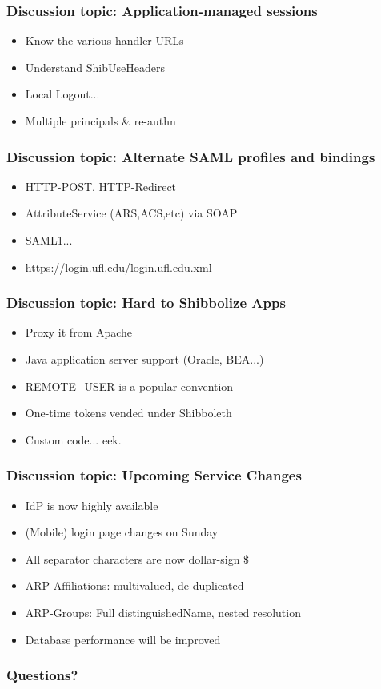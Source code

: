 \begin{frame}
\frametitle{Discussion topic: Application-managed sessions}
\begin{itemize}
\item Know the various handler URLs 
\item Understand ShibUseHeaders 
\item Local Logout... 
\item Multiple principals \& re-authn
\end{itemize}
\end{frame}

\begin{frame}
\frametitle{Discussion topic: Alternate SAML profiles and bindings}
\begin{itemize}
\item HTTP-POST, HTTP-Redirect
\item AttributeService (ARS,ACS,etc) via SOAP
\item SAML1... 
\item \url{https://login.ufl.edu/login.ufl.edu.xml}
\end{itemize}
\end{frame}

\begin{frame}
\frametitle{Discussion topic: Hard to Shibbolize Apps }
\begin{itemize}
\item Proxy it from Apache 
\item Java application server support (Oracle, BEA...)
\item REMOTE\_USER is a popular convention
\item One-time tokens vended under Shibboleth 
\item Custom code... eek.
\end{itemize}
\end{frame}

\begin{frame}
\frametitle{Discussion topic: Upcoming Service Changes}
\begin{itemize}
\item IdP is now highly available 
\item (Mobile) login page changes on Sunday 
\item All separator characters are now dollar-sign \$ 
\item ARP-Affiliations: multivalued, de-duplicated 
\item ARP-Groups: Full distinguishedName, nested resolution
\item Database performance will be improved
\end{itemize}
\end{frame}

\begin{frame}
\frametitle{Questions?}
\end{frame}


